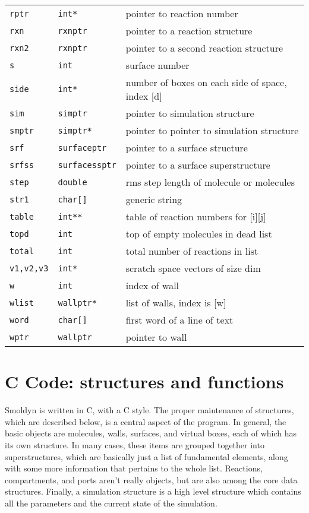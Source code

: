 \documentclass {scrbook}
\newcommand {\ttt} {\texttt}
\begin{document}
\begin{longtable}[c]{lll}
\ttt{rptr} & \ttt{int*} & pointer to reaction number\\
\ttt{rxn} & \ttt{rxnptr} & pointer to a reaction structure\\
\ttt{rxn2} & \ttt{rxnptr} & pointer to a second reaction structure\\
\ttt{s} & \ttt{int} & surface number\\
\ttt{side} & \ttt{int*} & number of boxes on each side of space, index [d]\\
\ttt{sim} & \ttt{simptr} & pointer to simulation structure\\
\ttt{smptr} & \ttt{simptr*} & pointer to pointer to simulation structure\\
\ttt{srf} & \ttt{surfaceptr} & pointer to a surface structure\\
\ttt{srfss} & \ttt{surfacessptr} & pointer to a surface superstructure\\
\ttt{step} & \ttt{double} & rms step length of molecule or molecules\\
\ttt{str1} & \ttt{char[]} & generic string\\
\ttt{table} & \ttt{int**} & table of reaction numbers for [i][j]\\
\ttt{topd} & \ttt{int} & top of empty molecules in dead list\\
\ttt{total} & \ttt{int} & total number of reactions in list\\
\ttt{v1,v2,v3} & \ttt{int*} & scratch space vectors of size dim\\
\ttt{w} & \ttt{int} & index of wall\\
\ttt{wlist} & \ttt{wallptr*} & list of walls, index is [w]\\
\ttt{word} & \ttt{char[]} & first word of a line of text\\
\ttt{wptr} & \ttt{wallptr} & pointer to wall\\
\end{longtable}

\chapter{C Code: structures and functions}

Smoldyn is written in C, with a C style. The proper maintenance of structures, which are described below, is a central aspect of the program. In general, the basic objects are molecules, walls, surfaces, and virtual boxes, each of which has its own structure. In many cases, these items are grouped together into superstructures, which are basically just a list of fundamental elements, along with some more information that pertains to the whole list. Reactions, compartments, and ports aren't really objects, but are also among the core data structures. Finally, a simulation structure is a high level structure which contains all the parameters and the current state of the simulation.
\end{document}
